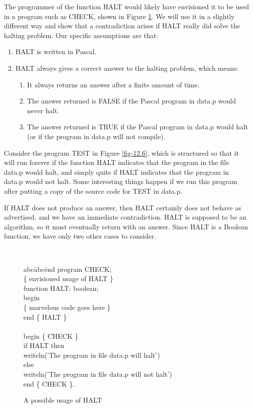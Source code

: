 The programmer of the function HALT would likely have envisioned it to be used
in a program such as CHECK, shown in Figure \ref{fig-12.5}. We will use it in a
slightly different way and show that a contradiction arises if HALT really did
solve the halting problem. Our specific assumptions are that:
\begin{enumerate}
\item HALT is written in Pascal.
\item HALT always gives a correct answer to the halting problem, which means:
\begin{enumerate}
\item It always returns an answer after a finite amount of time.
\item The answer returned is FALSE if the Pascal program in data.p would never
halt.
\item The answer returned is TRUE if the Pascal program in data.p would halt (or
if the program in data.p will not compile).
\end{enumerate}
\end{enumerate}

Consider the program TEST in Figure \ref{fig-12.6}, which is structured so that
it will run forever if the function HALT indicates that the program in the file
data.p would halt, and simply quits if HALT indicates that the program in data.p
would not halt. Some interesting things happen if we run this program after
putting a copy of the source code for TEST in data.p.

If HALT does not produce an answer, then HALT certainly does not behave as
advertised, and we have an immediate contradiction. HALT is supposed to be an
algorithm, so it must eventually return with an answer. Since HALT is a Boolean
function, we have only two other cases to consider.

\begin{figure}
{\tt
\begin{tabbing}
abc\=abc\=end \kill
program CHECK; \\
\{ envisioned usage of HALT \} \\
\> function HALT: boolean; \\
\> begin \\
\>\> \{ marvelous code goes here \} \\
\> end \{ HALT \} \\
\\
begin \{ CHECK \} \\
if HALT then \\
\> writeln('The program in file data.p will halt') \\
else \\
\> writeln('The program in file data.p will not halt') \\
end \{ CHECK \}.
\end{tabbing}
}
\caption{A possible usage of HALT}\label{fig-12.5}
\end{figure}

